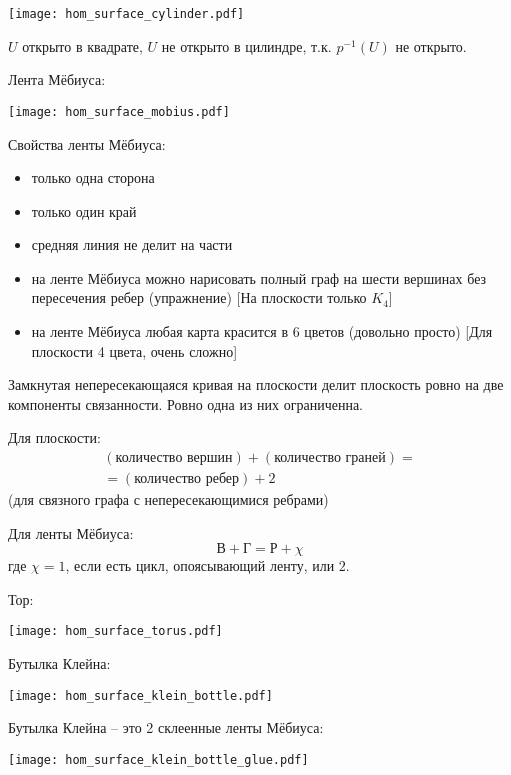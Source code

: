 \documentclass[main]{subfiles}
\begin{document}
\begin{center}
    \texttt{[image: hom\_surface\_cylinder.pdf]}
\end{center}
$U$ открыто в квадрате, $U$ не открыто в цилиндре, т.к. $p^{-1}(U)$ не открыто.

Лента Мёбиуса:
\begin{center}
    \texttt{[image: hom\_surface\_mobius.pdf]}
\end{center}
Свойства ленты Мёбиуса:
\begin{itemize}
    \item только одна сторона
    \item только один край
    \item средняя линия не делит на части
    \item на ленте Мёбиуса можно нарисовать полный граф на шести вершинах без пересечения ребер (упражнение) [На плоскости только $K_4$]
    \item на ленте Мёбиуса любая карта красится в 6 цветов (довольно просто) [Для плоскости 4 цвета, очень сложно]
\end{itemize}

\begin{theorem}[Жордана]
    Замкнутая непересекающаяся кривая на плоскости делит плоскость ровно на две компоненты связанности.
    Ровно одна из них ограниченна.
\end{theorem}

\begin{theorem}[Эйлера]
    Для плоскости:
    \begin{multline*}
        (\text{количество вершин}) + (\text{количество граней}) =\\
        = (\text{количество ребер}) + 2
    \end{multline*}
    (для связного графа с непересекающимися ребрами)

    Для ленты Мёбиуса:
    \[\text{В} + \text{Г} = \text{Р} + \chi\]
    где $\chi = 1$, если есть цикл, опоясывающий ленту, или $2$.
\end{theorem}

Тор:
\begin{center}
    \texttt{[image: hom\_surface\_torus.pdf]}
\end{center}

Бутылка Клейна:
\begin{center}
    \texttt{[image: hom\_surface\_klein\_bottle.pdf]}
\end{center}
Бутылка Клейна -- это 2 склеенные ленты Мёбиуса:
\begin{center}
    \texttt{[image: hom\_surface\_klein\_bottle\_glue.pdf]}
\end{center}
\end{document}
